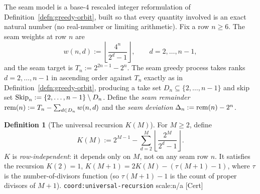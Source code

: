 \documentclass[11pt]{article}
\theoremstyle{plain}
\theoremstyle{definition}
\newtheorem{defn}[thm]{Definition}
\theoremstyle{remark}
\let\origmathrm\mathrm
\renewcommand{\mathrm}[1]{\ifmmode\origmathrm{#1}\else\textrm{#1}\fi}%
\newcommand{\ev}[1]{{\small\textsf{[#1]}}\xspace}
\newcommand{\scale}[1]{{\small\textsf{scale:#1}}\xspace}
\newcommand{\coord}[1]{\texorpdfstring{{\small\nolinkurl{coord:#1}}}{coord:#1}\xspace}
\begin{document}
The seam model is a base-$4$ rescaled integer reformulation of Definition~\ref{defn:greedy-orbit},
built so that every quantity involved is an exact natural number (no real-number or limiting
arithmetic). Fix a row $n \ge 6$. The seam weights at row $n$ are
\[
w(n,d) := \left\lfloor \frac{4^n}{2^d-1} \right\rfloor, \qquad d = 2,\dots,n-1,
\]
and the seam target is $T_n := 2^{2n-1} - 2^n$. The seam greedy process takes ranks $d = 2,\dots,n-1$
in ascending order against $T_n$ exactly as in Definition~\ref{defn:greedy-orbit}, producing a take
set $D_n \subseteq \{2,\dots,n-1\}$ and skip set
$\mathrm{Skip}_n := \{2,\dots,n-1\} \mathbin{\backslash} D_n$.
Define the \emph{seam remainder} $\mathrm{rem}(n) := T_n - \sum_{d \in D_n} w(n,d)$ and the
\emph{seam deviation} $\Delta_n := \mathrm{rem}(n) - 2^n$.

\begin{defn}[The universal recursion $K(M)$]
For $M \ge 2$, define
\[
K(M) := 2^{M-1} - \sum_{d=2}^{M} \left\lfloor \frac{2^M}{2^d-1} \right\rfloor.
\]
$K$ is \emph{row-independent}: it depends only on $M$, not on any seam row $n$. It satisfies the
recursion $K(2) = 1$, $K(M+1) = 2K(M) - (\tau(M+1)-1)$, where $\tau$ is the number-of-divisors
function (so $\tau(M+1)-1$ is the count of proper divisors of $M+1$). \coord{universal-recursion}
\scale{n/a} \ev{Cert}
\end{defn}
\end{document}
